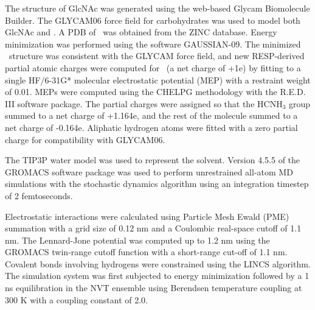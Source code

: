 The structure of GlcNAc was generated using the web-based Glycam Biomolecule Builder.\cite{Woods:glycambuilder} The GLYCAM06 force field for carbohydrates\cite{Kirschner:2008ii} was used to model both GlcNAc and \glucosamine. A PDB of \glucosamine\ was obtained from the ZINC database.\cite{Irwin:2005kx} Energy minimization was performed using the software GAUSSIAN-09.\cite{g09} The minimized \glucosamine\ structure was consistent with the GLYCAM force field, and new RESP-derived partial atomic charges were computed for \glucosamine\ (a net charge of +1e) by fitting to a single HF/6-31G* molecular electrostatic potential (MEP) with a restraint weight of 0.01. MEPs were computed using the CHELPG methodology\cite{Breneman:1990ue} with the R.E.D. III software package.\cite{Dupradeau:2010bb} The partial charges were assigned so that the HCNH$_{3}$ group summed to a net charge of +1.164e, and the rest of the molecule summed to a net charge of -0.164e. Aliphatic hydrogen atoms were fitted with a zero partial charge for compatibility with GLYCAM06.


The TIP3P water model was used to represent the solvent. Version 4.5.5 of the GROMACS software package\cite{Pronk:2013ef,Hess:2008p5353} was used to perform unrestrained all-atom MD simulations with the stochastic dynamics algorithm using an integration timestep of 2 femtoseconds.

Electrostatic interactions were calculated using Particle Mesh Ewald (PME) summation with a grid size of 0.12 nm and a Coulombic real-space cutoff of 1.1 nm. The Lennard-Jone potential was computed up to 1.2 nm using the GROMACS twin-range cutoff function with a short-range cut-off of 1.1 nm. Covalent bonds involving hydrogens were constrained using the LINCS algorithm. The simulation system was first subjected to energy minimization followed by a 1 ns equilibration in the NVT ensemble using Berendsen temperature coupling at 300 K with a coupling constant of 2.0.

